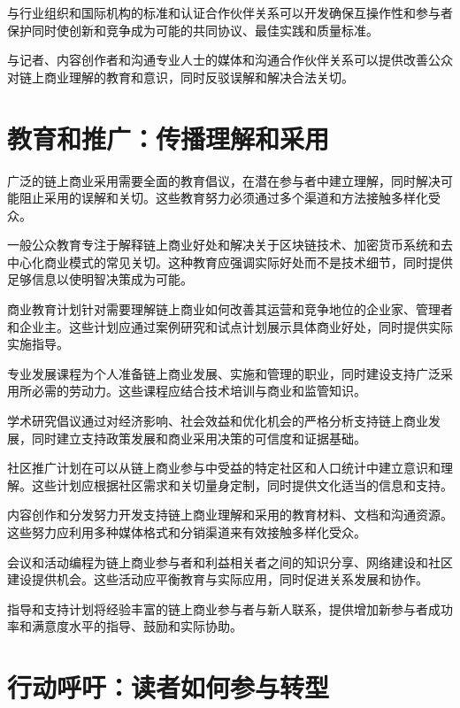 \documentclass[
  Letterpaper,
]{scrbook}
\begin{document}
与行业组织和国际机构的标准和认证合作伙伴关系可以开发确保互操作性和参与者保护同时使创新和竞争成为可能的共同协议、最佳实践和质量标准。

与记者、内容创作者和沟通专业人士的媒体和沟通合作伙伴关系可以提供改善公众对链上商业理解的教育和意识，同时反驳误解和解决合法关切。

\section{教育和推广：传播理解和采用}\label{ux6559ux80b2ux548cux63a8ux5e7fux4f20ux64adux7406ux89e3ux548cux91c7ux7528}

广泛的链上商业采用需要全面的教育倡议，在潜在参与者中建立理解，同时解决可能阻止采用的误解和关切。这些教育努力必须通过多个渠道和方法接触多样化受众。

一般公众教育专注于解释链上商业好处和解决关于区块链技术、加密货币系统和去中心化商业模式的常见关切。这种教育应强调实际好处而不是技术细节，同时提供足够信息以使明智决策成为可能。

商业教育计划针对需要理解链上商业如何改善其运营和竞争地位的企业家、管理者和企业主。这些计划应通过案例研究和试点计划展示具体商业好处，同时提供实际实施指导。

专业发展课程为个人准备链上商业发展、实施和管理的职业，同时建设支持广泛采用所必需的劳动力。这些课程应结合技术培训与商业和监管知识。

学术研究倡议通过对经济影响、社会效益和优化机会的严格分析支持链上商业发展，同时建立支持政策发展和商业采用决策的可信度和证据基础。

社区推广计划在可以从链上商业参与中受益的特定社区和人口统计中建立意识和理解。这些计划应根据社区需求和关切量身定制，同时提供文化适当的信息和支持。

内容创作和分发努力开发支持链上商业理解和采用的教育材料、文档和沟通资源。这些努力应利用多种媒体格式和分销渠道来有效接触多样化受众。

会议和活动编程为链上商业参与者和利益相关者之间的知识分享、网络建设和社区建设提供机会。这些活动应平衡教育与实际应用，同时促进关系发展和协作。

指导和支持计划将经验丰富的链上商业参与者与新人联系，提供增加新参与者成功率和满意度水平的指导、鼓励和实际协助。

\section{行动呼吁：读者如何参与转型}\label{ux884cux52a8ux547cux5401ux8bfbux8005ux5982ux4f55ux53c2ux4e0eux8f6cux578b}
\end{document}
